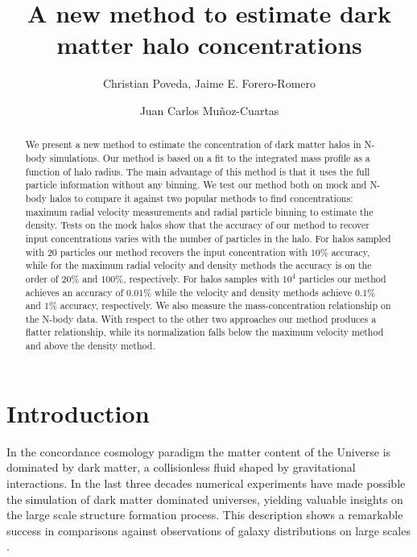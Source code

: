 \documentclass{emulateapj}
\begin{document}
\title{A new method to estimate dark matter halo concentrations}


\author{Christian Poveda, Jaime E. Forero-Romero}
\author{Juan Carlos Mu\~noz-Cuartas}


\begin{abstract}

We present a new method to estimate the concentration of dark matter
halos in N-body simulations.
Our method is based on a fit to the integrated mass profile as a function of
halo radius.
The main advantage of this method is that it uses the full particle information
without any binning.
We test our method both on mock and N-body halos to compare it against
two popular methods to find concentrations: maximum radial velocity
measurements and radial particle binning to estimate the density.
Tests on the mock halos show that the accuracy of our method to
recover input concentrations varies with the number of particles in
the halo. For halos sampled with $20$ particles our method recovers
the input concentration with $10\%$ accuracy, while for the maximum
radial velocity and density methods the accuracy is on the order of $20\%$ and
$100\%$, respectively. For halos samples with $10^4$ particles our
method achieves an accuracy of $0.01\%$ while the velocity and density
methods achieve $0.1\%$ and $1\%$ accuracy, respectively.
We also measure the mass-concentration relationship on the N-body
data.
With respect to the other two approaches our method produces a
flatter relationship, while its normalization falls below the maximum
velocity method and above the density method.
\end{abstract}



\section{Introduction}
\label{sec:introduction}
In the concordance cosmology paradigm the matter content of the
Universe is dominated by dark matter, a collisionless fluid shaped by
gravitational interactions.
In the last three decades numerical experiments have made possible the
simulation of dark matter dominated universes, yielding valuable
insights on the large scale structure formation process.
This description shows a remarkable success in comparisons against
observations of galaxy distributions on large scales
\citep{Springel2005,2011ApJ...740..102K}.
\end{document}
